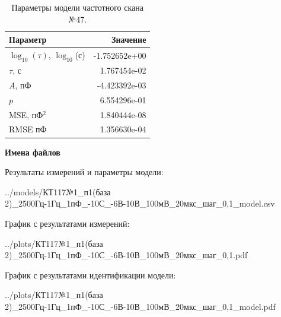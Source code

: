 \begin{table}[!ht]
    \centering
    \caption{Параметры модели частотного скана №47.}
    \begin{tabular}{|l|r|}
        \hline
        Параметр                                       & Значение                  \\ \hline
        $\log_{10}(\tau)$, $\log_{10}$(с)              & -1.752652e+00             \\ \hline
        $\tau$, с                                      & 1.767454e-02              \\ \hline
        $A$, пФ                                        & -4.423392e-03             \\ \hline
        $p$                                            & 6.554296e-01              \\ \hline
        MSE, пФ$^2$                                    & 1.840444e-08              \\ \hline
        RMSE пФ                                        & 1.356630e-04              \\ \hline
    \end{tabular}
    \label{table:frequency_scan_model_47}
\end{table}

\textbf{Имена файлов}

Результаты измерений и параметры модели:

\scriptsize../models/КТ117№1\_п1(база 2)\_2500Гц-1Гц\_1пФ\_-10С\_-6В-10В\_100мВ\_20мкс\_шаг\_0,1\_model.csv
\normalsize

График с результатами измерений:

\scriptsize../plots/КТ117№1\_п1(база 2)\_2500Гц-1Гц\_1пФ\_-10С\_-6В-10В\_100мВ\_20мкс\_шаг\_0,1.pdf
\normalsize

График с результатами идентификации модели:

\scriptsize../plots/КТ117№1\_п1(база 2)\_2500Гц-1Гц\_1пФ\_-10С\_-6В-10В\_100мВ\_20мкс\_шаг\_0,1\_model.pdf
\normalsize


